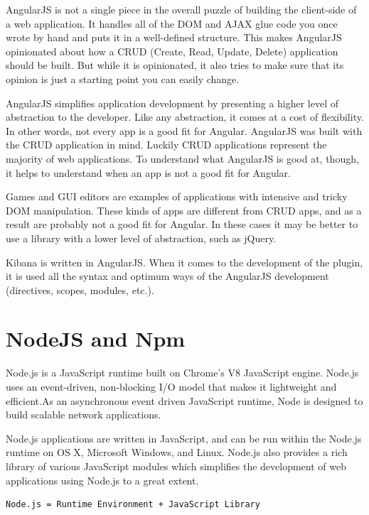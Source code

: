 \documentclass[a4paper, 12pt]{book}
\begin{document}
AngularJS is not a single piece in the overall puzzle of building the client-side of a web application. It handles all of the DOM and AJAX glue code you once wrote by hand and puts it in a well-defined structure. This makes AngularJS opinionated about how a CRUD (Create, Read, Update, Delete) application should be built. But while it is opinionated, it also tries to make sure that its opinion is just a starting point you can easily change.

AngularJS simplifies application development by presenting a higher level of abstraction to the developer. Like any abstraction, it comes at a cost of flexibility. In other words, not every app is a good fit for Angular. AngularJS was built with the CRUD application in mind. Luckily CRUD applications represent the majority of web applications. To understand what AngularJS is good at, though, it helps to understand when an app is not a good fit for Angular.

Games and GUI editors are examples of applications with intensive and tricky DOM manipulation. These kinds of apps are different from CRUD apps, and as a result are probably not a good fit for Angular. In these cases it may be better to use a library with a lower level of abstraction, such as jQuery.

Kibana is written in AngularJS. When it comes to the development of the plugin, it is used all the syntax and optimum ways of the AngularJS development (directives, scopes, modules, etc.).

\section{NodeJS and Npm}
\label{sec:nodejsnpm}
Node.js is a JavaScript runtime built on Chrome's V8 JavaScript engine. Node.js uses an event-driven, non-blocking I/O model that makes it lightweight and efficient.As an asynchronous event driven JavaScript runtime, Node is designed to build scalable network applications.

Node.js applications are written in JavaScript, and can be run within the Node.js runtime on OS X, Microsoft Windows, and Linux. Node.js also provides a rich library of various JavaScript modules which simplifies the development of web applications using Node.js to a great extent.

\begin{lstlisting}[frame=single]
Node.js = Runtime Environment + JavaScript Library
\end{lstlisting}
\end{document}
